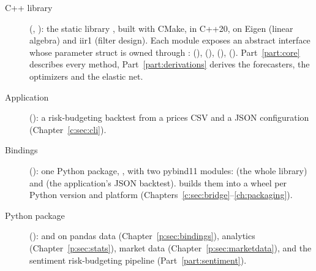 \begin{description}
  \item[C++ library] (, ): the static library , built with
        CMake, in C++20, on Eigen (linear algebra) and iir1 (filter design). Each module exposes an abstract
        interface whose parameter struct is owned through : 
        (),  (), 
        (),  (). Part~\ref{part:core} describes every
        method, Part~\ref{part:derivations} derives the forecasters, the optimizers and the elastic net.
  \item[Application]  (): a risk-budgeting backtest from a
        prices CSV and a JSON configuration (Chapter~\ref{c:sec:cli}).
  \item[Bindings] (): one Python package, , with two pybind11
        modules:  (the whole library) and  (the application's JSON backtest).
         builds them into a wheel per Python version and platform
        (Chapters~\ref{c:sec:bridge}--\ref{ch:packaging}).
  \item[Python package] ():  and  on
        pandas data (Chapter~\ref{p:sec:bindings}), analytics (Chapter~\ref{p:sec:stats}), market data
        (Chapter~\ref{p:sec:marketdata}), and the sentiment risk-budgeting pipeline 
        (Part~\ref{part:sentiment}).
\end{description}

